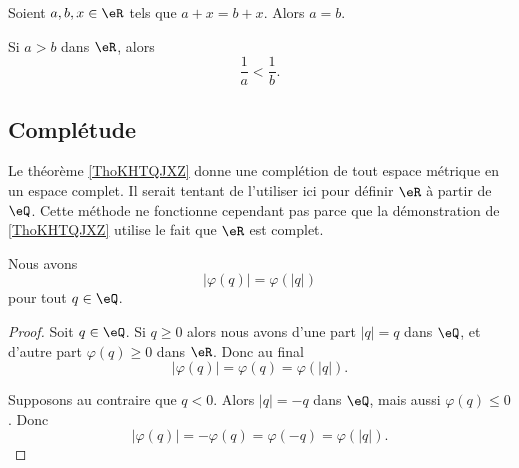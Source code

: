 \begin{lemma}       \label{LEMooFQMVooDNaTDT}
	Soient \( a,b,x\in \eR\) tels que \( a+x=b+x\). Alors \( a=b\).
\end{lemma}

\begin{proposition}		\label{PROPooVIDJooSzXPLP}
	Si \( a>b\) dans \( \eR\), alors
	\begin{equation}
		\frac{1}{ a}<\frac{1}{ b}.
	\end{equation}
\end{proposition}

\subsection{Complétude}

Le théorème \ref{ThoKHTQJXZ} donne une complétion de tout espace métrique en un espace complet. Il serait tentant de l'utiliser ici pour définir \( \eR\) à partir de \( \eQ\). Cette méthode ne fonctionne cependant pas parce que la démonstration de \ref{ThoKHTQJXZ} utilise le fait que \( \eR\) est complet.

\begin{lemma}       \label{LEMooXCVRooOSZYWv}
	Nous avons
	\begin{equation}
		| \varphi(q) |= \varphi(| q |)
	\end{equation}
	pour tout \( q\in \eQ\).
\end{lemma}

\begin{proof}
	Soit \( q\in \eQ\). Si \( q\geq 0\) alors nous avons d'une part \( | q |=q\) dans \( \eQ\), et d'autre part \( \varphi(q)\geq 0\) dans \( \eR\). Donc au final
	\begin{equation}
		| \varphi(q) |=\varphi(q)=\varphi(| q |).
	\end{equation}

	Supposons au contraire que \( q<0\). Alors \( | q |=-q\) dans \( \eQ\), mais aussi \( \varphi(q)\leq 0\). Donc
	\begin{equation}
		| \varphi(q) |=-\varphi(q)=\varphi(-q)=\varphi(| q |).
	\end{equation}
\end{proof}

